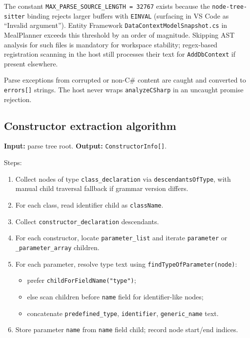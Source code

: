 The constant \texttt{MAX\_PARSE\_SOURCE\_LENGTH = 32767} exists because the \texttt{node-tree-sitter} binding rejects larger buffers with \texttt{EINVAL} (surfacing in VS Code as ``Invalid argument''). Entity Framework \texttt{DataContextModelSnapshot.cs} in MealPlanner exceeds this threshold by an order of magnitude. Skipping AST analysis for such files is mandatory for workspace stability; regex-based registration scanning in the host still processes their text for \texttt{AddDbContext} if present elsewhere.

Parse exceptions from corrupted or non-C\# content are caught and converted to \texttt{errors[]} strings. The host never wraps \texttt{analyzeCSharp} in an uncaught promise rejection.

\subsection{Constructor extraction algorithm}

\textbf{Input:} parse tree root. \textbf{Output:} \texttt{ConstructorInfo[]}.

Steps:
\begin{enumerate}
	\item Collect nodes of type \texttt{class\_declaration} via \texttt{descendantsOfType}, with manual child traversal fallback if grammar version differs.
	\item For each class, read identifier child as \texttt{className}.
	\item Collect \texttt{constructor\_declaration} descendants.
	\item For each constructor, locate \texttt{parameter\_list} and iterate \texttt{parameter} or \texttt{\_parameter\_array} children.
	\item For each parameter, resolve type text using \texttt{findTypeOfParameter(node)}:
	\begin{itemize}
		\item prefer \texttt{childForFieldName("type")};
		\item else scan children before \texttt{name} field for identifier-like nodes;
		\item concatenate \texttt{predefined\_type}, \texttt{identifier}, \texttt{generic\_name} text.
	\end{itemize}
	\item Store parameter \texttt{name} from \texttt{name} field child; record node start/end indices.
\end{enumerate}

